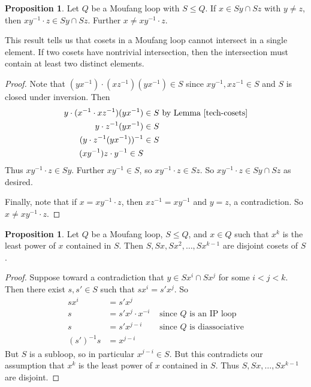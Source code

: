 \documentclass[12pt]{report}
\theoremstyle{definition}
\newtheorem{prp}[thm]{Proposition}
\begin{document}
\begin{prp}
  Let $Q$ be a Moufang loop with $S\leq Q$. If $x\in Sy\cap Sz$ with $y\neq z$, then $xy^{-1}\cdot z\in Sy\cap Sz$.
    Further $x\neq xy^{-1}\cdot z$.
\end{prp}

This result tells us that cosets in a Moufang loop cannot intersect in a single element. If two cosets have
  nontrivial intersection, then the intersection must contain at least two distinct elements.

\begin{proof}
  Note that $(yx^{-1})\cdot (xz^{-1})(yx^{-1})\in S$ since $xy^{-1}, xz^{-1}\in S$ and $S$ is closed
    under inversion. Then
  \begin{align*}
    y\cdot(x^{-1}\cdot xz^{-1})(yx^{-1})&\in S\text{ by Lemma \ref{tech-cosets}}\\
    y\cdot z^{-1}(yx^{-1}) &\in S\\
    (y\cdot z^{-1}(yx^{-1}))^{-1} &\in S\\
    (xy^{-1})z\cdot y^{-1}\in S
  \end{align*}
  Thus $xy^{-1}\cdot z\in Sy$. Further $xy^{-1}\in S$, so $xy^{-1}\cdot z \in Sz$. So
    $xy^{-1}\cdot z\in Sy\cap Sz$ as desired.

  Finally, note that if $x = xy^{-1}\cdot z $, then $xz^{-1} = xy^{-1}$ and $y = z $, a
    contradiction. So $x\neq xy^{-1}\cdot z$.
\end{proof}

\begin{prp}\label{power-cosets}
  Let $Q$ be a Moufang loop, $S\leq Q$, and $x\in Q$ such that $x^k$ is the least power of $x$
    contained in $S$. Then $S, Sx, Sx^2, \ldots, Sx^{k - 1}$ are disjoint cosets of $S$.
\end{prp}

\begin{proof}
  Suppose toward a contradiction that $y\in Sx^i\cap Sx^j$ for some $i < j < k$. Then there
    exist $s, s'\in S$ such that $sx^i = s'x^j$. So
  \begin{align*}
    sx^i &= s'x^j\\
    s &= s'x^j\cdot x^{-i} &\text{ since $Q$ is an IP loop}\\
    s &= s'x^{j - i} &\text{ since $Q$ is diassociative}\\
    (s')^{-1}s &= x^{j - i}
  \end{align*}
  But $S$ is a subloop, so in particular $x^{j - i}\in S$. But this contradicts our assumption
    that $x^k$ is the least power of $x$ contained in $S$. Thus $S, Sx, \ldots, Sx^{k - 1}$ are disjoint.
\end{proof}
\end{document}
